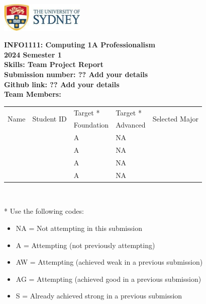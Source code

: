 \documentclass[a4paper, 11pt]{report}
\begin{document}
\begin{titlepage}
\begin{flushright}
\includegraphics[width=4cm]{USyd}\\[1cm]
\end{flushright}

\begin{centering}
\textbf{\huge INFO1111: Computing 1A Professionalism}\\[0.75cm]
\textbf{\huge 2024 Semester 1}\\[2cm]
\textbf{\huge Skills: Team Project Report}\\[2cm]

\textbf{\large Submission number: ?? Add your details}\\[0.5cm]
\textbf{\large Github link: ?? Add your details}\\[0.75cm]
\textbf{\huge Team Members:}\\[0.75cm]

\begin{tabular}{|p{}|p{}|p{}|p{}|p{}|}
	\hline
	\multirow{2}{*}{Name} & \multirow{2}{*}{Student ID} & Target * & Target * & \multirow{2}{*}{Selected Major} \\
	 & & Foundation & Advanced & \\
	\hline
	\hline
	\raggedright{\studA} & \sidA & A & NA & \majA \\
	\hline
	\raggedright{\studB} & \sidB & A & NA & \majB \\
	\hline
	\raggedright{\studC} & \sidC & A & NA & \majC \\
	\hline
	\raggedright{\studD} & \sidD & A & NA & \majD \\
	\hline
\end{tabular}
\\[0.5cm]
\end{centering}

* Use the following codes:
\begin{itemize}
\setlength\itemsep{0em}
\item NA = Not attempting in this submission
\item A = Attempting (not previously attempting)
\item AW = Attempting (achieved weak in a previous submission) 
\item AG = Attempting (achieved good in a previous submission)
\item S = Already achieved strong in a previous submission
\end{itemize}

\thispagestyle{empty}
\end{titlepage}
\end{document}
